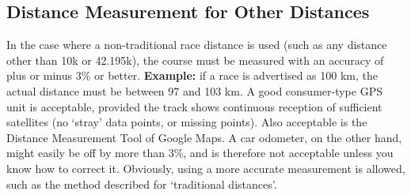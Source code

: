 \subsection {Distance Measurement for Other Distances}

In the case where a non-traditional race distance is used (such as any distance other than 10k or 42.195k), the course must be measured with an accuracy of plus or minus 3\% or better.
\textbf{Example:} if a race is advertised as 100 km, the actual distance must be between 97 and 103 km.
A good consumer-type GPS unit is acceptable, provided the track shows continuous reception of sufficient satellites (no `stray' data points, or missing points).
Also acceptable is the Distance Measurement Tool of Google Maps.
A car odometer, on the other hand, might easily be off by more than 3\%, and is therefore not acceptable unless you know how to correct it.
Obviously, using a more accurate measurement is allowed, such as the method described for `traditional distances'.
